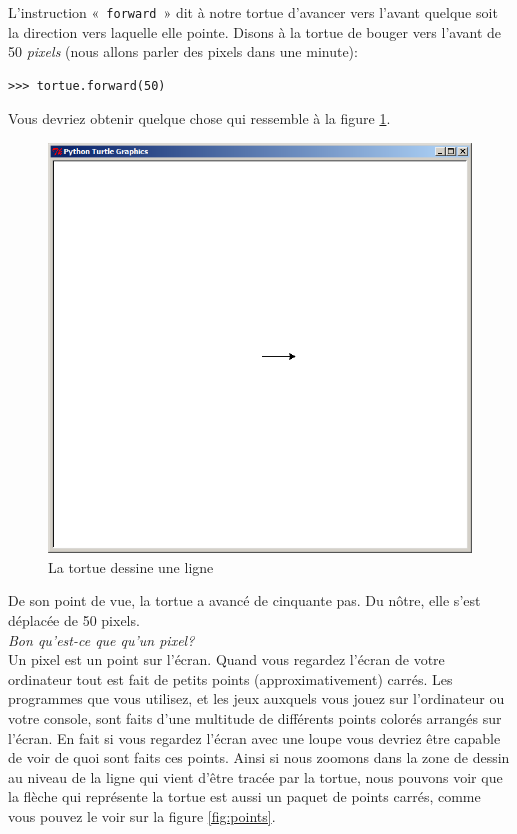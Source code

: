 L'instruction «~\texttt{forward}~» dit à notre tortue d'avancer vers l'avant quelque soit la direction vers laquelle elle pointe. Disons à la tortue de bouger vers l'avant de 50 \emph{pixels} (nous allons parler des pixels dans une minute):

\begin{Verbatim}[frame=single,rulecolor=\color{mbleu}, label=à taper]
>>> tortue.forward(50)
\end{Verbatim}

Vous devriez obtenir quelque chose qui ressemble à la figure \ref{fig:50px}.

\begin{figure}[!ht]
\centering
\includegraphics[scale=0.4]{images/50px.png}
\caption{La tortue dessine une ligne}
\label{fig:50px}
\end{figure}

De son point de vue, la tortue a avancé de cinquante pas. Du nôtre, elle s'est déplacée  de 50 pixels.\\


\emph{Bon qu'est-ce que qu'un pixel?}\\

Un pixel est un point sur l'écran. Quand vous regardez l'écran de votre ordinateur tout est fait de petits points (approximativement) carrés. Les programmes que vous utilisez, et les jeux auxquels vous jouez sur l'ordinateur ou votre console, sont faits d'une multitude de différents points colorés arrangés sur l'écran. En fait si vous regardez l'écran avec une loupe vous devriez être capable de voir de quoi sont faits ces points. Ainsi si nous zoomons dans la zone de dessin au niveau de la ligne qui vient d'être tracée par la tortue, nous pouvons voir que la flèche qui représente la tortue est aussi un paquet de points carrés, comme vous pouvez le voir sur la figure \ref{fig:points}.

